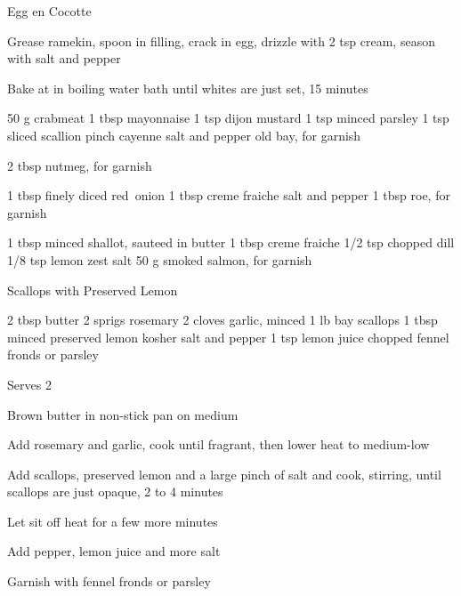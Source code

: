 \begin{densecard}{Egg en Cocotte}{}
\begin{densesteps}
    \item Grease ramekin, spoon in filling, crack in egg, drizzle with 2 tsp cream, season with salt and pepper
    \item Bake at  in boiling water bath until whites are just set, 15 minutes
\end{densesteps}
\begin{paracol}{3}

\begin{ingredients}
50 g crabmeat
1 tbsp mayonnaise
1 tsp dijon mustard
1 tsp minced parsley
1 tsp sliced scallion
pinch cayenne
salt and pepper
old bay, for garnish
\end{ingredients}
\nextcolumn
{}\hfill {}

\begin{ingredients}
2 tbsp 
nutmeg, for garnish
\end{ingredients}


\begin{ingredients}
1 tbsp finely diced red~onion
1 tbsp creme fraiche
salt and pepper
1 tbsp roe, for garnish
\end{ingredients}
\nextcolumn
{}

\begin{ingredients}
1 tbsp minced shallot, sauteed in butter
1 tbsp creme fraiche
1/2 tsp chopped dill
1/8 tsp lemon zest
salt
50 g smoked salmon, for garnish
\end{ingredients}
\end{paracol}
\end{densecard}

\begin{recipe}{Scallops with Preserved Lemon}{}
\begin{ingredients}
2 tbsp butter
2 sprigs rosemary
2 cloves garlic, minced
1 lb bay scallops
1 tbsp minced preserved lemon
kosher salt and pepper
1 tsp lemon juice
chopped fennel fronds or parsley
\end{ingredients}
\nextcolumn
Serves 2
\begin{steps}
    \item Brown butter in non-stick pan on medium
    \item Add rosemary and garlic, cook until fragrant, then lower heat to medium-low
    \item Add scallops, preserved lemon and a large pinch of salt and cook, stirring, until scallops are just opaque, 2 to 4 minutes
    \item Let sit off heat for a few more minutes
    \item Add pepper, lemon juice and more salt
    \item Garnish with fennel fronds or parsley
\end{steps}
\end{recipe}

